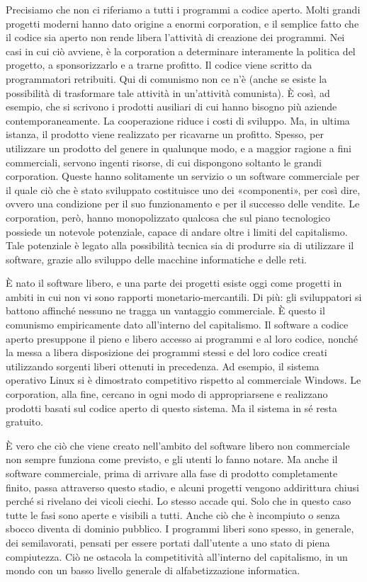 \documentclass[../main]{subfiles}
\begin{document}
Precisiamo che non ci riferiamo a tutti i programmi a codice aperto. Molti grandi progetti moderni hanno dato origine a enormi corporation, e il semplice fatto che il codice sia aperto non rende libera l'attività di creazione dei programmi. Nei casi in cui ciò avviene, è la corporation a determinare interamente la politica del progetto, a sponsorizzarlo e a trarne profitto. Il codice viene scritto da programmatori retribuiti. Qui di comunismo non ce n'è (anche se esiste la possibilità di trasformare tale attività in un'attività comunista). È così, ad esempio, che si scrivono i prodotti ausiliari di cui hanno bisogno più aziende contemporaneamente. La cooperazione riduce i costi di sviluppo. Ma, in ultima istanza, il prodotto viene realizzato per ricavarne un profitto. Spesso, per utilizzare un prodotto del genere in qualunque modo, e a maggior ragione a fini commerciali, servono ingenti risorse, di cui dispongono soltanto le grandi corporation. Queste hanno solitamente un servizio o un software commerciale per il quale ciò che è stato sviluppato costituisce uno dei «componenti», per così dire, ovvero una condizione per il suo funzionamento e per il successo delle vendite. Le corporation, però, hanno monopolizzato qualcosa che sul piano tecnologico possiede un notevole potenziale, capace di andare oltre i limiti del capitalismo. Tale potenziale è legato alla possibilità tecnica sia di produrre sia di utilizzare il software, grazie allo sviluppo delle macchine informatiche e delle reti.

È nato il software libero, e una parte dei progetti esiste oggi come progetti in ambiti in cui non vi sono rapporti monetario-mercantili. Di più: gli sviluppatori si battono affinché nessuno ne tragga un vantaggio commerciale. È questo il comunismo empiricamente dato all'interno del capitalismo. Il software a codice aperto presuppone il pieno e libero accesso ai programmi e al loro codice, nonché la messa a libera disposizione dei programmi stessi e del loro codice creati utilizzando sorgenti liberi ottenuti in precedenza. Ad esempio, il sistema operativo Linux si è dimostrato competitivo rispetto al commerciale Windows. Le corporation, alla fine, cercano in ogni modo di appropriarsene e realizzano prodotti basati sul codice aperto di questo sistema. Ma il sistema in sé resta gratuito.

È vero che ciò che viene creato nell'ambito del software libero non commerciale non sempre funziona come previsto, e gli utenti lo fanno notare. Ma anche il software commerciale, prima di arrivare alla fase di prodotto completamente finito, passa attraverso questo stadio, e alcuni progetti vengono addirittura chiusi perché si rivelano dei vicoli ciechi. Lo stesso accade qui. Solo che in questo caso tutte le fasi sono aperte e visibili a tutti. Anche ciò che è incompiuto o senza sbocco diventa di dominio pubblico. I programmi liberi sono spesso, in generale, dei semilavorati, pensati per essere portati dall'utente a uno stato di piena compiutezza. Ciò ne ostacola la competitività all'interno del capitalismo, in un mondo con un basso livello generale di alfabetizzazione informatica.
\end{document}
